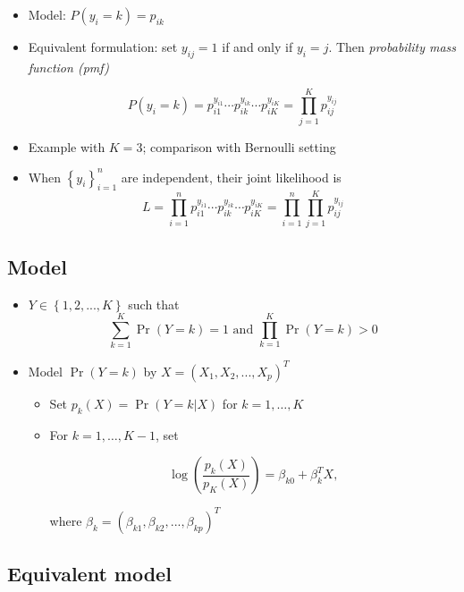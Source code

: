 \documentclass[]{article}
\providecommand{\tightlist}{%
  \setlength{\itemsep}{0pt}\setlength{\parskip}{0pt}}
\begin{document}
\begin{itemize}
\tightlist
\item
  Model: \(P(y_i=k) = p_{ik}\)
\item
  Equivalent formulation: set \(y_{ij}=1\) if and only if \(y_{i}=j\).
  Then \emph{probability mass function (pmf)}
\end{itemize}

\[P(y_i=k) = p_{i1}^{y_{i1}}\cdots p_{ik}^{y_{ik}}\cdots
p_{iK}^{y_{iK}}=\prod_{j=1}^{K}p_{ij}^{y_{ij}}\]

\begin{itemize}
\item
  Example with \(K=3\); comparison with Bernoulli setting
\item
  When \(\left\{ y_{i}\right\} _{i=1}^{n}\) are independent, their joint
  likelihood is \[
  L=\prod_{i=1}^{n}p_{i1}^{y_{i1}}\cdots p_{ik}^{y_{ik}}\cdots p_{iK}^{y_{iK}%
  }=\prod_{i=1}^{n}\prod_{j=1}^{K}p_{ij}^{y_{ij}}%
  \]
\end{itemize}

\subsection{Model}\label{model}

\begin{itemize}
\tightlist
\item
  \(Y \in \left\{ 1,2,...,K\right\}\) such that \[
  \sum_{k=1}^{K}\Pr\left(  Y=k\right)  =1\text{ and }\prod_{k=1}^{K}\Pr\left(
  Y=k\right)  >0
  \]
\item
  Model \(\Pr\left( Y=k\right)\) by
  \(X=\left( X_{1},X_{2},...,X_{p}\right) ^{T}\)

  \begin{itemize}
  \tightlist
  \item
    Set \(p_{k}\left( X\right) =\Pr(Y=k|X)\) for \(k=1,\ldots,K\)
  \item
    For \(k=1,\ldots,K-1\), set

    \begin{equation}
    \log\left(  \frac{p_{k}\left(  X\right)  }{p_{K}\left(  X\right)  }\right)
    =\beta_{k0}+\beta_{k}^{T}X, 
    \end{equation}

    where
    \(\beta_{k}=\left( \beta_{k1},\beta_{k2},...,\beta_{kp}\right) ^{T}\)
  \end{itemize}
\end{itemize}

\subsection{Equivalent model}\label{equivalent-model}
\end{document}
